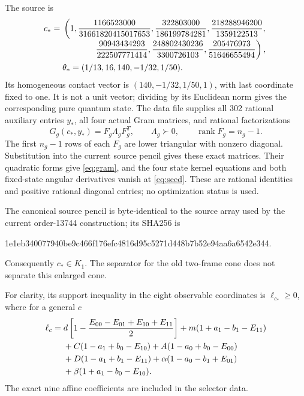 \documentclass[11pt]{article}
\begin{document}
The source is
\begin{equation}
\begin{aligned}
 c_*={}&\left(1,
 \frac{1166523000}{31661820415017653},
 \frac{322803000}{186199784281},
 \frac{218288946200}{1359122513},\right.\\[-1mm]
 &\left.\hspace{13mm}
 \frac{90943434293}{222507771414},
 \frac{248802430236}{3300726103},
 \frac{205476973}{51646655494}\right),\\
 &\theta_*=(1/13,16,140,-1/32,1/50).
\end{aligned}
\label{eq:seed}
\end{equation}
Its homogeneous contact vector is $(140,-1/32,1/50,1)$, with last
coordinate fixed to one.  It is not a unit vector; dividing by its
Euclidean norm gives the corresponding pure quantum state.
The data file
supplies all 302 rational auxiliary entries $y_*$, all four actual Gram
matrices, and rational factorizations
\begin{equation}
 G_g(c_*,y_*)=F_g\Lambda_gF_g^T,
 \qquad \Lambda_g\succ0,
 \qquad \operatorname{rank}F_g=n_g-1.
 \label{eq:seedfact}
\end{equation}
The first $n_g-1$ rows of each $F_g$ are lower triangular with nonzero
diagonal.  Substitution into the current source pencil gives these exact
matrices.  Their quadratic forms give \eqref{eq:gram}, and the four state
kernel equations and both fixed-state angular derivatives vanish at
\eqref{eq:seed}.  These are rational identities and positive rational
diagonal entries; no optimization status is used.

The canonical source pencil is byte-identical to the source array used
by the current order-13744 construction; its SHA256 is
\begin{center}\small\ttfamily
1e1eb340077940be9c466f176efc4816d95c5271d448b7b52e94aa6a6542e344.
\end{center}
Consequently $c_*\in K_1$.  The separator for the old two-frame cone
does not separate this enlarged cone.

For clarity, its support inequality in the eight observable coordinates is
$\ell_{c_*}\geq0$, where for a general $c$
\begin{align}
\ell_c={}&d\left[1-\frac{E_{00}-E_{01}+E_{10}+E_{11}}2\right]
 +m(1+a_1-b_1-E_{11})\notag\\
 &+C(1-a_1+b_0-E_{10})+A(1-a_0+b_0-E_{00})\notag\\
 &+D(1-a_1+b_1-E_{11})
 +\alpha(1-a_0-b_1+E_{01})\notag\\
 &+\beta(1+a_1-b_0-E_{10}).
 \label{eq:visible}
\end{align}
The exact nine affine coefficients are included in the selector data.
\end{document}
